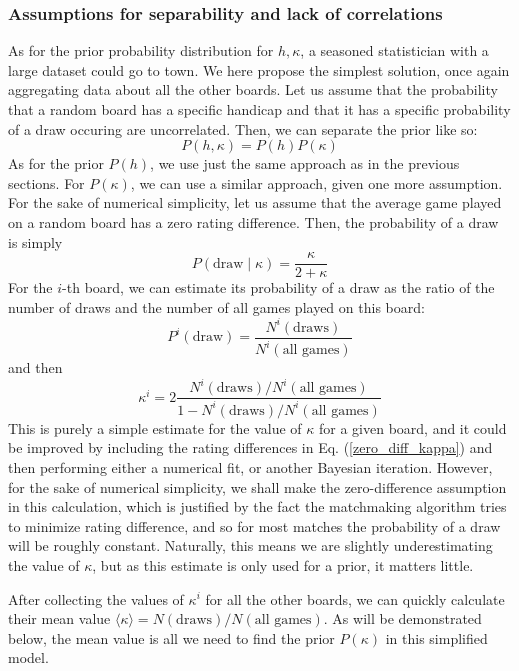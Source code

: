 \documentclass[12pt]{article}
\begin{document}
	\subsubsection{Assumptions for separability and lack of correlations}
	As for the prior probability distribution for $h,\kappa$, a seasoned statistician with a large dataset could go to town. We here propose the simplest solution, once again aggregating data about all the other boards. Let us assume that the probability that a random board has a specific handicap and that it has a specific probability of a draw occuring are uncorrelated. Then, we can separate the prior like so:
	\begin{equation}
	P(h,\kappa) = P(h)P(\kappa)
	\end{equation}
	As for the prior $P(h)$, we use just the same approach as in the previous sections. For $P(\kappa)$, we can use a similar approach, given one more assumption. For the sake of numerical simplicity, let us assume that the average game played on a random board has a zero rating difference. Then, the probability of a draw is simply
	\begin{equation} \label{zero_diff_kappa}
	P(\text{draw}\mid\kappa)=\frac{\kappa}{2+\kappa}
	\end{equation}
	For the $i$-th board, we can estimate its probability of a draw as the ratio of the number of draws and the number of all games played on this board:
	$$P^i(\text{draw})=\frac{N^i(\text{draws})}{N^i(\text{all games})}$$
	and then
	$$\kappa^i=2\frac{N^i(\text{draws})/N^i(\text{all games})}{1-N^i(\text{draws})/N^i(\text{all games})}$$
	This is purely a simple estimate for the value of $\kappa$ for a given board, and it could be improved by including the rating differences in Eq. (\ref{zero_diff_kappa}) and then performing either a numerical fit, or another Bayesian iteration. However, for the sake of numerical simplicity, we shall make the zero-difference assumption in this calculation, which is justified by the fact the matchmaking algorithm tries to minimize rating difference, and so for most matches the probability of a draw will be roughly constant. Naturally, this means we are slightly underestimating the value of $\kappa$, but as this estimate is only used for a prior, it matters little.
	
	After collecting the values of $\kappa^i$ for all the other boards, we can quickly calculate their mean value $\langle\kappa\rangle=N(\text{draws})/N(\text{all games})$. As will be demonstrated below, the mean value is all we need to find the prior $P(\kappa)$ in this simplified model.
\end{document}
